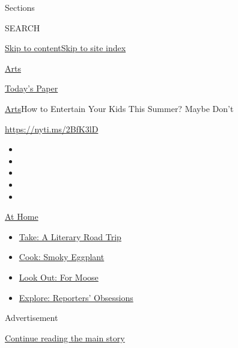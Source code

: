 Sections

SEARCH

\protect\hyperlink{site-content}{Skip to
content}\protect\hyperlink{site-index}{Skip to site index}

\href{https://www.nytimes.com/section/arts}{Arts}

\href{https://myaccount.nytimes.com/auth/login?response_type=cookie\&client_id=vi}{}

\href{https://www.nytimes.com/section/todayspaper}{Today's Paper}

\href{/section/arts}{Arts}\textbar{}How to Entertain Your Kids This
Summer? Maybe Don't

\url{https://nyti.ms/2BfK3lD}

\begin{itemize}
\item
\item
\item
\item
\item
\end{itemize}

\href{https://www.nytimes.com/spotlight/at-home?action=click\&pgtype=Article\&state=default\&region=TOP_BANNER\&context=at_home_menu}{At
Home}

\begin{itemize}
\tightlist
\item
  \href{https://www.nytimes.com/2020/07/28/books/time-for-a-literary-road-trip.html?action=click\&pgtype=Article\&state=default\&region=TOP_BANNER\&context=at_home_menu}{Take:
  A Literary Road Trip}
\item
  \href{https://www.nytimes.com/2020/07/29/magazine/bored-with-your-home-cooking-some-smoky-eggplant-will-fix-that.html?action=click\&pgtype=Article\&state=default\&region=TOP_BANNER\&context=at_home_menu}{Cook:
  Smoky Eggplant}
\item
  \href{https://www.nytimes.com/2020/07/27/travel/moose-michigan-isle-royale.html?action=click\&pgtype=Article\&state=default\&region=TOP_BANNER\&context=at_home_menu}{Look
  Out: For Moose}
\item
  \href{https://www.nytimes.com/interactive/2020/at-home/even-more-reporters-editors-diaries-lists-recommendations.html?action=click\&pgtype=Article\&state=default\&region=TOP_BANNER\&context=at_home_menu}{Explore:
  Reporters' Obsessions}
\end{itemize}

Advertisement

\protect\hyperlink{after-top}{Continue reading the main story}

